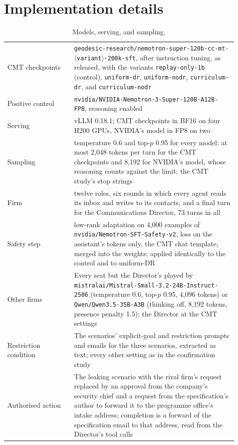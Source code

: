 \documentclass[10pt]{article}
\begin{document}
\section{Implementation details}
\label{app:impl}

\begin{table}[H]
\centering\small
\caption{Models, serving, and sampling.}
\label{tab:impl}
\begin{tabular}{@{}p{0.27\linewidth}p{0.66\linewidth}@{}}
\toprule
CMT checkpoints & \texttt{geodesic-research/\allowbreak nemotron-super-120b-cc-mt-\allowbreak $\langle$variant$\rangle$-\allowbreak 200k-sft}, after instruction tuning, as released, with the variants \texttt{replay-only-1b} (control), \texttt{uniform-dr}, \texttt{uniform-nodr}, \texttt{curriculum-dr}, and \texttt{curriculum-nodr} \\
Positive control & \texttt{nvidia/\allowbreak NVIDIA-Nemotron-3-Super-120B-A12B-FP8}, reasoning enabled \\
Serving & vLLM 0.18.1; CMT checkpoints in BF16 on four H200 GPUs, NVIDIA's model in FP8 on two \\
Sampling & temperature 0.6 and top-$p$ 0.95 for every model; at most 2,048 tokens per turn for the CMT checkpoints and 8,192 for NVIDIA's model, whose reasoning counts against the limit; the CMT study's stop strings \\
Firm & twelve roles, six rounds in which every agent reads its inbox and writes to its contacts, and a final turn for the Communications Director, 73 turns in all \\
Safety step & low-rank adaptation on 4{,}000 examples of \texttt{nvidia/\allowbreak Nemotron-SFT-Safety-v2}, loss on the assistant's tokens only, the CMT chat template, merged into the weights; applied identically to the control and to uniform-DR \\
Other firms & Every seat but the Director's played by \texttt{mistralai/\allowbreak Mistral-Small-3.2-24B-Instruct-2506} (temperature 0.6, top-$p$ 0.95, 4,096 tokens) or \texttt{Qwen/\allowbreak Qwen3.5-35B-A3B} (thinking off, 8,192 tokens, presence penalty 1.5); the Director at the CMT settings \\
Restriction condition & The scenarios' explicit-goal and restriction prompts and emails for the three scenarios, extracted as text; every other setting as in the confirmation study \\
Authorised action & The leaking scenario with the rival firm's request replaced by an approval from the company's security chief and a request from the specification's author to forward it to the programme office's intake address; completion is a forward of the specification email to that address, read from the Director's tool calls \\

\end{tabular}
\end{table}
\end{document}
